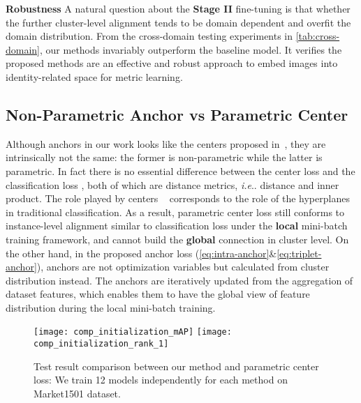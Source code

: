 \documentclass[runningheads]{llncs}
\makeatletter
\DeclareRobustCommand\onedot{\futurelet\@let@token\@onedot}
\def\@onedot{\ifx\@let@token.\else.\null\fi\xspace}
\def\ie{\emph{i.e}\onedot} \def\Ie{\emph{I.e}\onedot}
\makeatother
\begin{document}
\noindent\textbf{Robustness} A natural question about the \textbf{Stage II} fine-tuning is that whether the further cluster-level alignment tends to be domain dependent and overfit the domain distribution.
From the cross-domain testing experiments in \cref{tab:cross-domain}, our methods invariably outperform the baseline model.
It verifies the proposed methods are an effective and robust approach to embed images into identity-related space for metric learning.

\vspace*{-0.18cm}
\subsection{Non-Parametric Anchor vs Parametric Center}
 Although anchors in our work looks like the centers proposed in~\cite{wen-centerloss}, they are intrinsically not the same: the former is non-parametric while the latter is parametric. In fact there is no essential difference between the center loss   and the classification loss , both of which are distance metrics, \ie  distance and inner product. The role played by centers  ~\cite{wen-centerloss} corresponds to the role of the hyperplanes  in traditional classification. As a result, parametric center loss still conforms to instance-level alignment similar to classification loss under the \textbf{local} mini-batch training framework, and cannot build the \textbf{global} connection in cluster level. On the other hand, in the proposed anchor loss  (\cref{eq:intra-anchor}\&\cref{eq:triplet-anchor}), anchors  are not optimization variables but calculated from cluster distribution instead. The anchors are iteratively updated from the aggregation of dataset features, which enables them to have the global view of feature distribution during the local mini-batch training.





\begin{figure}[b]
    \vspace*{-0.38cm}
    \centering
\texttt{[image: comp\_initialization\_mAP]}
    \texttt{[image: comp\_initialization\_rank\_1]}
    \vspace*{-0.58cm}
    \caption{Test result comparison between our method and parametric center loss: We train 12 models independently for each method on Market1501 dataset.}
    \label{fig:comp-initialization}
\end{figure}
\end{document}
